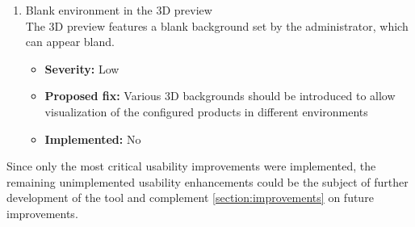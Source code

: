 \begin{enumerate}[label=\textbf{I\arabic*:}, leftmargin=*]
    \item Blank environment in the 3D preview
        \vspace{2pt}
        \\The 3D preview features a blank background set by the administrator, which can appear bland.
        \begin{itemize}[noitemsep, label=\trianglebullet]
            \item \textbf{Severity:} Low
            \item \textbf{Proposed fix:} Various 3D backgrounds should be introduced to allow visualization of the configured products in different environments
            \item \textbf{Implemented:} No
        \end{itemize}
        \vspace{4pt}
\end{enumerate}

Since only the most critical usability improvements were implemented, the remaining unimplemented usability enhancements could be the subject of further development of the tool and complement \autoref{section:improvements} on future improvements.
